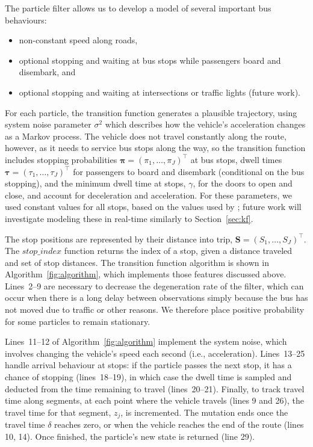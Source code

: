The particle filter allows us to develop a model of several important bus behaviours:
\begin{itemize}
\item non-constant speed along roads,
\item optional stopping and waiting at bus stops while passengers board and disembark, and
\item optional stopping and waiting at intersections or traffic lights (future work).
\end{itemize}

For each particle, the transition function generates a plausible trajectory,
using system noise parameter $\sigma^2$ which describes 
how the vehicle's acceleration changes as a Markov process.
The vehicle does not travel constantly along the route,
however, as it needs to service bus stops along the way,
so the transition function includes 
stopping probabilities $\boldsymbol\pi = (\pi_1,\ldots,\pi_J)^\top$ at bus stops,
dwell times $\boldsymbol\tau = (\tau_1,\ldots,\tau_J)^\top$ for passengers to
board and disembark (conditional on the bus stopping),
and the minimum dwell time at stops, $\gamma$,
for the doors to open and close,
and account for deceleration and acceleration.
For these parameters, we used constant values for all stops,
based on the values used by \cite{Hans_2015};
future work will investigate modeling these in real-time similarly to Section~\ref{sec:kf}.

The stop positions are represented by their distance into trip,
$\boldsymbol{S} = (S_1, \ldots, S_J)^\top$.
The $stop\_index$ function returns the index of a stop,
given a distance traveled and set of stop distances.
The transition function algorithm is shown in Algorithm~\ref{fig:algorithm},
which implements those features discussed above.
Lines~2--9 are necessary to decrease the degeneration rate of the filter,
which can occur when there is a long delay between observations
simply because the bus has not moved due to traffic or other reasons. 
We therefore place positive probability for some particles to remain stationary.

Lines~11--12 of Algorithm~\ref{fig:algorithm} implement the system noise,
which involves changing the vehicle's speed each second (i.e., acceleration).
Lines~13--25 handle arrival behaviour at stops:
if the particle passes the next stop,
it has a chance of stopping (lines~18--19),
in which case the dwell time is sampled and deducted from the 
time remaining to travel (lines~20--21).
Finally, to track travel time along segments,
at each point where the vehicle travels (lines 9 and 26),
the travel time for that segment, $z_j$, is incremented.
The mutation ends once the travel time $\delta$ reaches zero,
or when the vehicle reaches the end of the route (lines 10, 14).
Once finished, the particle's new state is returned (line 29).

